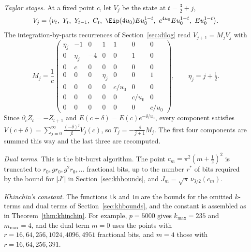 \emph{Taylor stages.} At a fixed point $c$, let $V_j$ be the state at $t = \frac32 + j$,
\[
  V_j = \bigl(\nu_t,\ Y_t,\ Y_{t-1},\ C_t,\ \Eip(4u_0)Eu_0^{1-t},\ e^{4u_0}Eu_0^{1-t},\ Eu_0^{1-t}\bigr).
\]
The integration-by-parts recurrences of Section~\ref{sec:dilog} read $V_{j+1} = M_jV_j$ with
\[
  M_j = \frac1c\begin{pmatrix}
  \eta_j & -1 & 0 & 1 & 1 & 0 & 0 \\
  0 & \eta_j & -4 & 0 & 0 & 1 & 0 \\
  0 & c & 0 & 0 & 0 & 0 & 0 \\
  0 & 0 & 0 & \eta_j & 0 & 0 & 1 \\
  0 & 0 & 0 & 0 & c/u_0 & 0 & 0 \\
  0 & 0 & 0 & 0 & 0 & c/u_0 & 0 \\
  0 & 0 & 0 & 0 & 0 & 0 & c/u_0
  \end{pmatrix}, \qquad \eta_j = j + \tfrac12.
\]
Since $\partial_cZ_t = -Z_{t+1}$ and $E(c+\delta) = E(c)e^{-\delta/u_0}$, every component satisfies
$V(c+\delta) = \sum_{j=0}^{\infty}\frac{(-\delta)^j}{j!}V_j(c)$, so $T_j = -\frac{\delta}{j+1}M_j$. The first four
components are summed this way and the last three are recomputed.

\emph{Dual terms.} This is the bit-burst algorithm. The point $c_m = \pi^2(m+\frac12)^2$ is truncated to
$r_0, gr_0, g^2r_0, \dots$ fractional bits, up to the number $r^*$ of bits required by the bound for $|J'|$ in
Section~\ref{sec:khbounds}, and $J_m = \sqrt\pi\,\nu_{3/2}(c_m)$.

\emph{Khinchin's constant.} The functions \texttt{tk} and \texttt{tm} are the bounds for the omitted $k$-terms and
dual terms of Section~\ref{sec:khbounds}, and the constant is assembled as in Theorem~\ref{thm:khinchin}. For
example, $p = 5000$ gives $k_{\max} = 235$ and $m_{\max} = 4$, and the dual term $m = 0$ uses the points with
$r = 16, 64, 256, 1024, 4096, 4951$ fractional bits, and $m = 4$ those with $r = 16, 64, 256, 391$.
